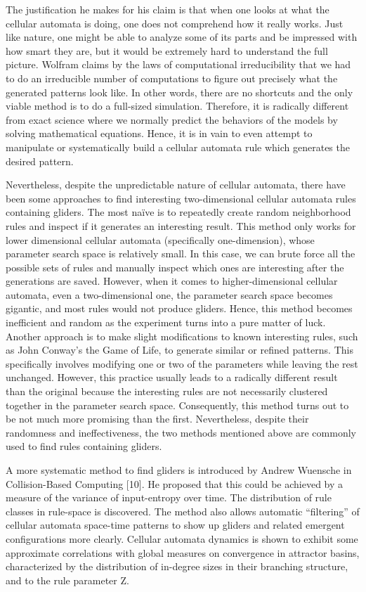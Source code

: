 \documentclass[12pt]{article}
\numberwithin{figure}{section} %
\begin{document}
The justification he makes for his claim is that when one looks at what the cellular automata is doing, one does not comprehend how it really works. Just like nature, one might be able to analyze some of its parts and be impressed with how smart they are, but it would be extremely hard to understand the full picture. Wolfram claims by the laws of computational irreducibility that we had to do an irreducible number of computations to figure out precisely what the generated patterns look like. In other words, there are no shortcuts and the only viable method is to do a full-sized simulation. Therefore, it is radically different from exact science where we normally predict the behaviors of the models by solving mathematical equations. Hence, it is in vain to even attempt to manipulate or systematically build a cellular automata rule which generates the desired pattern. 

Nevertheless, despite the unpredictable nature of cellular automata, there have been some approaches to find interesting two-dimensional cellular automata rules containing gliders. The most naïve is to repeatedly create random neighborhood rules and inspect if it generates an interesting result. This method only works for lower dimensional cellular automata (specifically one-dimension), whose parameter search space is relatively small. In this case, we can brute force all the possible sets of rules and manually inspect which ones are interesting after the generations are saved. However, when it comes to higher-dimensional cellular automata, even a two-dimensional one, the parameter search space becomes gigantic, and most rules would not produce gliders. Hence, this method becomes inefficient and random as the experiment turns into a pure matter of luck. Another approach is to make slight modifications to known interesting rules, such as John Conway’s the Game of Life, to generate similar or refined patterns. This specifically involves modifying one or two of the parameters while leaving the rest unchanged. However, this practice usually leads to a radically different result than the original because the interesting rules are not necessarily clustered together in the parameter search space. Consequently, this method turns out to be not much more promising than the first. Nevertheless, despite their randomness and ineffectiveness, the two methods mentioned above are commonly used to find rules containing gliders. 

A more systematic method to find gliders is introduced by Andrew Wuensche in Collision-Based Computing [10]. He proposed that this could be achieved by a measure of the variance of input-entropy over time. The distribution of rule classes in rule-space is discovered. The method also allows automatic “filtering” of cellular automata space-time patterns to show up gliders and related emergent configurations more clearly. Cellular automata dynamics is shown to exhibit some approximate correlations with global measures on convergence in attractor basins, characterized by the distribution of in-degree sizes in their branching structure, and to the rule parameter Z. 
\end{document}
